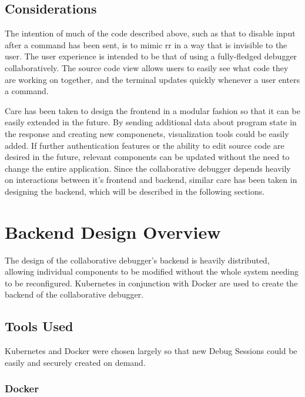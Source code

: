 \documentclass[12pt]{article}
\begin{document}
\subsection{Considerations} \label{vistools}

The intention of much of the code described above, such as that to
disable input after a command has been sent, is to mimic rr in a way
that is invisible to the user.  The user experience is intended to be
that of using a fully-fledged debugger collaboratively.  The source
code view allows users to easily see what code they are working on
together, and the terminal updates quickly whenever a user enters a
command.
\par

Care has been taken to design the frontend in a modular fashion so
that it can be easily extended in the future.  By sending additional
data about program state in the response and creating new componenets,
visualization tools could be easily added.  If further authentication
features or the ability to edit source code are desired in the future,
relevant components can be updated without the need to change the
entire application.  Since the collaborative debugger depends heavily
on interactions between it's frontend and backend, similar care has
been taken in designing the backend, which will be described in the
following sections.

\section{Backend Design Overview}

The design of the collaborative debugger's backend is heavily
distributed, allowing individual components to be modified without the
whole system needing to be reconfigured.  Kubernetes in conjunction
with Docker are used to create the backend of the collaborative
debugger.

\subsection{Tools Used}

Kubernetes and Docker were chosen largely so that new Debug Sessions
could be easily and securely created on demand.

\subsubsection{Docker}\label{docker}
\end{document}
